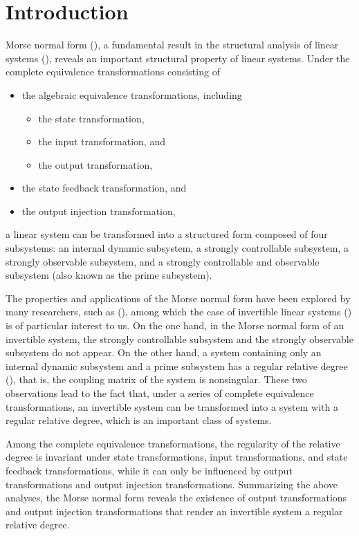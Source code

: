 \documentclass[sort&compress]{elsarticle}
\begin{document}
\section{Introduction}

Morse normal form (\cite{Morse1973SIAM[J]}),
a fundamental result in the structural analysis of linear systems
(\cite{Kouri23,Nicolau25,Sepitka25}),
reveals an important structural property of linear systems.
Under the complete equivalence transformations consisting of
\begin{itemize}
\item the algebraic equivalence transformations, including
  \begin{itemize}
  \item the state transformation,
  \item the input transformation, and
  \item the output transformation,
  \end{itemize}
\item the state feedback transformation, and
\item the output injection transformation,
\end{itemize}
a linear system can be transformed into a structured form composed of four subsystems:
an internal dynamic subsystem,
a strongly controllable subsystem,
a strongly observable subsystem, and
a strongly controllable and observable subsystem (also known as the prime subsystem).

The properties and applications of the Morse normal form have been explored
by many researchers, such as
(\cite{Kucera2019ECC[C],Kucera2020TAC[J],Patil2021,Chen2021,Zhou2024IJC[J]}),
among which the case of invertible linear systems
(\cite{Rospondek2017,Zhou2024IJC[J]})
is of particular interest to us.
On the one hand,
in the Morse normal form of an invertible system,
the strongly controllable subsystem
and the strongly observable subsystem do not appear.
On the other hand,
a system containing only an internal dynamic subsystem and
a prime subsystem has a regular relative degree
(\cite{Mueller2009[J],Zhou2023Auto[J],Guo}),
that is,
the coupling matrix of the system is nonsingular.
These two observations lead to the fact that,
under a series of complete equivalence transformations,
an invertible system can be transformed into
a system with a regular relative degree,
which is an important class of systems.

Among the complete equivalence transformations,
the regularity of the relative degree is invariant under
state transformations, input transformations,
and state feedback transformations,
while it can only be influenced by output transformations
and output injection transformations.
Summarizing the above analyses,
the Morse normal form reveals the existence of
output transformations and output injection transformations
that render an invertible system a regular relative degree.
\end{document}
